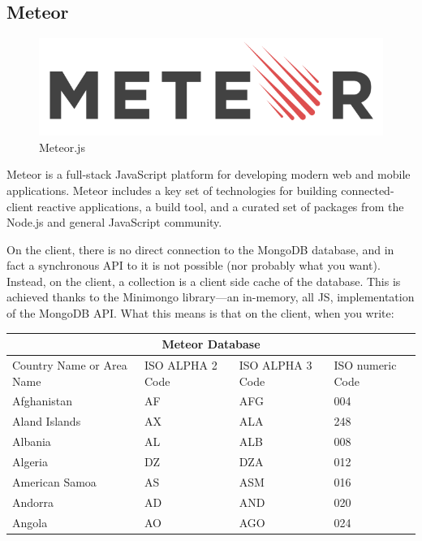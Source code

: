 \documentclass[12pt,a4paper]{report}
\begin{document}
	\subsection{Meteor}
		\begin{figure}
			\includegraphics[scale=.2]{meteorJS}
			\caption{Meteor.js}
			\label{fig: Meteor.js}
		\end{figure}
		Meteor is a full-stack JavaScript platform for developing modern web and mobile applications. Meteor includes a key set of technologies for building connected-client reactive applications, a build tool, and a curated set of packages from the Node.js and general JavaScript community.
		
		
		
		On the client, there is no direct connection to the MongoDB database, and in fact a synchronous API to it is not possible (nor probably what you want). Instead, on the client, a collection is a client side cache of the database. This is achieved thanks to the Minimongo library—an in-memory, all JS, implementation of the MongoDB API. What this means is that on the client, when you write:
		
		
		
		\begin{tabular}{ |p{3cm}||p{3cm}|p{3cm}|p{3cm}|  }
			\hline
			\multicolumn{4}{|c|}{Meteor Database} \\
			\hline
			Country Name     or Area Name& ISO ALPHA 2 Code &ISO ALPHA 3 Code&ISO numeric Code\\
			\hline
			Afghanistan   & AF    &AFG&   004\\
			Aland Islands&   AX  & ALA   &248\\
			Albania &AL & ALB&  008\\
			Algeria    &DZ & DZA&  012\\
			American Samoa&   AS  & ASM&016\\
			Andorra& AD  & AND   &020\\
			Angola& AO  & AGO&024\\
			\hline
		\end{tabular}
		
\end{document}
